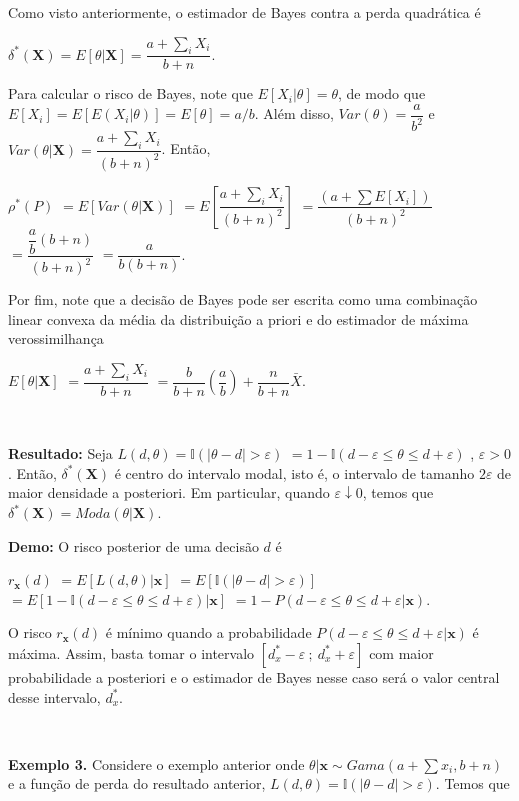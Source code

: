 \documentclass[
]{book}
\begin{document}
Como visto anteriormente, o estimador de Bayes contra a perda quadrática é

\(\delta^*(\boldsymbol X)=E[\theta|\boldsymbol X]=\dfrac{a+\sum_iX_i}{b+n}\).

Para calcular o risco de Bayes, note que \(E[X_i|\theta]=\theta\), de modo que \(E[X_i]=E\left[E(X_i|\theta)\right]=E[\theta]=a/b\). Além disso, \(Var(\theta)=\dfrac{a}{b^2}\) e \(Var(\theta|\boldsymbol X)=\dfrac{a+\sum_iX_i}{(b+n)^2}\). Então,

\(\rho^*(P)\) \(=E\left[Var(\theta|\boldsymbol X)\right]\) \(=E\left[\dfrac{a+\sum_iX_i}{(b+n)^2}\right]\) \(= \dfrac{\left(a+\sum E[X_i]\right)}{(b+n)^2}\) \(=\dfrac{\dfrac{a}{b}\left(b+n\right)}{(b+n)^2}\) \(=\dfrac{a}{b(b+n)}\).

Por fim, note que a decisão de Bayes pode ser escrita como uma combinação linear convexa da média da distribuição a priori e do estimador de máxima verossimilhança

\(E[\theta|\boldsymbol X]\) \(=\dfrac{a+\sum_iX_i}{b+n}\) \(=\dfrac{b}{b+n}\left(\dfrac{a}{b}\right)+\dfrac{n}{b+n}\bar{X}\).

\(~\)

\textbf{Resultado:} Seja \(L(d,\theta)=\mathbb{I}(|\theta-d|> \varepsilon)\) \(=1-\mathbb{I}(d-\varepsilon\leq \theta \leq d+\varepsilon)\) , \(\varepsilon > 0\).
Então, \(\delta^*(\boldsymbol X)\) é centro do intervalo modal, isto é, o intervalo de tamanho \(2\varepsilon\) de maior densidade a posteriori. Em particular, quando \(\varepsilon \downarrow 0\), temos que \({\delta}^*(\boldsymbol X)=Moda(\theta|\boldsymbol X)\).

\textbf{Demo:} O risco posterior de uma decisão \(d\) é

\(r_{\boldsymbol{x}}(d)\) \(=E\left[L(d,\theta)|\boldsymbol{x}\right]\) \(=E\left[\mathbb{I}(|\theta-d|> \varepsilon)\right]\) \(=E\left[1-\mathbb{I}(d-\varepsilon\leq \theta \leq d+\varepsilon)|\boldsymbol x\right]\) \(=1-P(d-\varepsilon\leq \theta \leq d+\varepsilon|\boldsymbol x)\).

O risco \(r_{\boldsymbol{x}}(d)\) é mínimo quando a probabilidade \(P(d-\varepsilon\leq \theta \leq d+\varepsilon|\boldsymbol x)\) é máxima. Assim, basta tomar o intervalo \(\left[{d}_x^*-\varepsilon ~;~ {d}_x^*+\varepsilon\right]\) com maior probabilidade a posteriori e o estimador de Bayes nesse caso será o valor central desse intervalo, \({d}_x^*\).

\(~\)

\textbf{Exemplo 3.} Considere o exemplo anterior onde \(\theta|\boldsymbol x\sim Gama(a+\sum x_i,b+n)\) e a função de perda do resultado anterior, \(L(d,\theta)=\mathbb{I}(|\theta-d|> \varepsilon)\). Temos que
\end{document}
